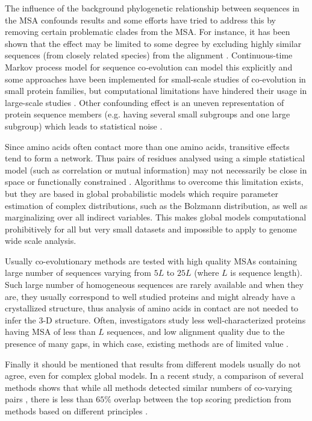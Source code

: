 The influence of the background phylogenetic relationship between sequences in the MSA confounds results and some efforts have tried to address this by removing certain problematic clades from the MSA.
For instance, it has been shown that the effect may be limited to some degree by excluding highly similar sequences (from closely related species) from the alignment \cite{wollenberg2000separation}.
Continuous-time Markov process model for sequence co‐evolution can model this explicitly and some approaches have been implemented for small-scale studies of co‐evolution in small protein families, but computational limitations have hindered their usage in large-scale studies \cite{de2013emerging}.
Other confounding effect is an uneven representation of protein sequence members (e.g. having several small subgroups and one large subgroup) which leads to statistical noise \cite{marks2012protein}.

Since amino acids often contact more than one amino acids, transitive effects tend to form a network.
Thus pairs of residues analysed using a simple statistical model (such as correlation or mutual information) may not necessarily be close in space or functionally constrained \cite{marks2012protein}.
Algorithms to overcome this limitation exists, but they are based in global probabilistic models which require parameter estimation of complex distributions, such as the Bolzmann distribution, as well as marginalizing over all indirect variables.
This makes global models computational prohibitively for all but very small datasets and impossible to apply to genome wide scale analysis.

Usually co-evolutionary methods are tested with high quality MSAs containing large number of sequences varying from $5L$ to $25L$ (where $L$ is  sequence length).
Such large number of homogeneous sequences are rarely available and when they are, they usually correspond to well studied proteins and might already have a crystallized structure, thus analysis of amino acids in contact are not needed to infer the 3-D structure.
Often, investigators study less well-characterized proteins having MSA of less than $L$ sequences, and low alignment quality due to the presence of many gaps, in which case, existing methods are of limited value \cite{clark2014multidimensional}.

Finally it should be mentioned that results from different models usually do not agree, even for complex global models.
In a recent study, a comparison of several methods shows that while all methods detected similar numbers of co-varying pairs
, there is less than $65\%$ overlap between the top scoring prediction from methods based on different principles \cite{clark2014multidimensional}.
